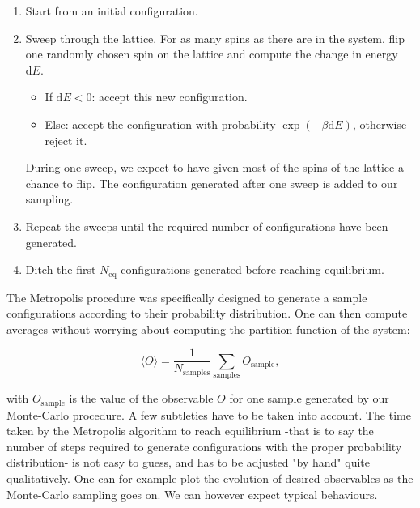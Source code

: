 \documentclass[11pt,openany]{article}
\begin{document}
\begin{tcolorbox}[title=Metropolis-Hasting algorithm]
	
	\begin{enumerate}
		
		\item Start from an initial configuration.
		
		\item Sweep through the lattice. For as many spins as there are in the system, flip one randomly chosen spin on the lattice and compute the change in energy $\mathrm{d}E$.
			\begin{itemize}
				\item If $\mathrm{d}E<0$: accept this new configuration.
				
				\item Else: accept the configuration with probability $\exp\left(-\beta \mathrm{d}E\right)$, otherwise reject it.
			\end{itemize}
		
		During one sweep, we expect to have given most of the spins of the lattice a chance to flip. The configuration generated after one sweep is added to our sampling.
		
		\item Repeat the sweeps until the required number of configurations have been generated.
		
		\item Ditch the first $N_\mathrm{eq}$ configurations generated before reaching equilibrium.
		
	\end{enumerate}
	
\end{tcolorbox}

The Metropolis procedure was specifically designed to generate a sample configurations according to their probability distribution. One can then compute averages without worrying about computing the partition function of the system:

\begin{equation}
	\langle O\rangle = \frac{1}{N_\mathrm{samples}}\sum_\mathrm{samples} O_\mathrm{sample},
\end{equation}

with $O_\mathrm{sample}$ is the value of the observable $O$ for one sample generated by our Monte-Carlo procedure. A few subtleties have to be taken into account. The time taken by the Metropolis algorithm to reach equilibrium -that is to say the number of steps required to generate configurations with the proper probability distribution- is not easy to guess, and has to be adjusted "by hand" quite qualitatively. One can for example plot the evolution of desired observables as the Monte-Carlo sampling goes on. We can however expect typical behaviours.
\end{document}
